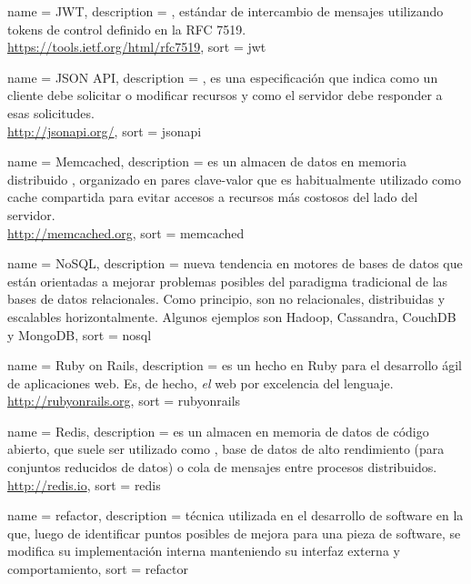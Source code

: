  {
  name = {JWT},
  description = {, estándar de intercambio de mensajes utilizando tokens de control definido en la RFC 7519.\\\url{https://tools.ietf.org/html/rfc7519}},
  sort = {jwt}
}

 {
  name = {JSON API},
  description = {, es una especificación que indica como un cliente debe solicitar o modificar recursos y como el servidor debe responder a esas solicitudes.\\\url{http://jsonapi.org/}},
  sort = {jsonapi}
}

 {
  name = {Memcached},
  description = {es un almacen de datos en memoria distribuido , organizado en pares clave-valor que es habitualmente utilizado como cache compartida para evitar accesos a recursos más costosos del lado del servidor.\\\url{http://memcached.org}},
  sort = {memcached}
}

 {
  name = {NoSQL},
  description = {nueva tendencia en motores de bases de datos que están orientadas a mejorar problemas posibles del paradigma tradicional de las bases de datos relacionales. Como principio, son no relacionales, distribuidas y escalables horizontalmente. Algunos ejemplos son Hadoop, Cassandra, CouchDB y MongoDB},
  sort = {nosql}
}

 {
  name = {Ruby on Rails},
  description = {es un  hecho en Ruby para el desarrollo ágil de aplicaciones web. Es, de hecho, \textit{el}  web por excelencia del lenguaje.\\\url{http://rubyonrails.org}},
  sort = {rubyonrails}
}

 {
  name = {Redis},
  description = {es un almacen en memoria de datos de código abierto, que suele ser utilizado como , base de datos de alto rendimiento (para conjuntos reducidos de datos) o cola de mensajes entre procesos distribuidos.\\\url{http://redis.io}},
  sort = {redis}
}

 {
  name = {refactor},
  description = {técnica utilizada en el desarrollo de software en la que, luego de identificar puntos posibles de mejora para una pieza de software, se modifica su implementación interna manteniendo su interfaz externa y comportamiento},
  sort = {refactor}
}

